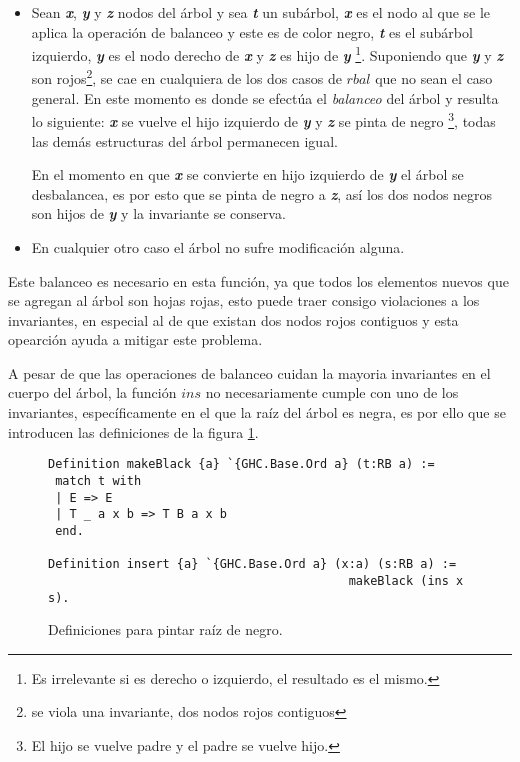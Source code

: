 \begin{itemize}
    \item Sean \textbf{\textit{x}}, \textbf{\textit{y}} y \textbf{\textit{z}} nodos del \'arbol y sea \textbf{\textit{t}} un subárbol, \textbf{\textit{x}} es el nodo al que se le
    aplica la operaci\'on de balanceo y este es de color negro, \textbf{\textit{t}} es el subárbol izquierdo, \textbf{\textit{y}}
    es el nodo derecho de \textbf{\textit{x}} y \textbf{\textit{z}} es hijo de \textbf{\textit{y}} \footnote{Es irrelevante si es derecho o
    izquierdo, el resultado es el mismo.}. Suponiendo que \textbf{\textit{y}} y \textbf{\textit{z}} son rojos\footnote{se viola una
    invariante, dos nodos rojos contiguos}, se cae en cualquiera de los dos casos de $rbal$ que no
    sean el caso general. En este momento es donde se efectúa el \textit{balanceo} del árbol y
    resulta lo siguiente: \textbf{\textit{x}} se vuelve el hijo izquierdo de \textbf{\textit{y}} y \textbf{\textit{z}} se pinta de negro
    \footnote{El hijo se vuelve padre y el padre se vuelve hijo.}, todas las dem\'as estructuras del
    \'arbol permanecen igual.

    En el momento en que \textbf{\textit{x}} se convierte en hijo izquierdo de \textbf{\textit{y}} el \'arbol se desbalancea, es
    por esto que se pinta de negro a \textbf{\textit{z}}, así los dos nodos negros son hijos de \textbf{\textit{y}} y la invariante
    se conserva.
    \item En cualquier otro caso el \'arbol no sufre modificaci\'on alguna.
\end{itemize}

Este balanceo es necesario en esta funci\'on, ya que todos los elementos nuevos que se agregan al \'arbol 
son hojas rojas, esto puede traer consigo violaciones a los invariantes, en especial al de que existan dos nodos rojos 
contiguos y esta opearci\'on ayuda a mitigar este problema.

A pesar de que las operaciones de balanceo cuidan la mayoria invariantes en el cuerpo del \'arbol,
la función $ins$ no necesariamente cumple con uno de los invariantes, espec\'ificamente
en el que la raíz del árbol es negra, es por ello que se introducen las definiciones de 
la figura \ref{raiz_negra_func}.

\begin{figure}
\centering
\captionsetup{justification=centering}
\begin{verbatim}
Definition makeBlack {a} `{GHC.Base.Ord a} (t:RB a) :=
 match t with
 | E => E
 | T _ a x b => T B a x b
 end.

Definition insert {a} `{GHC.Base.Ord a} (x:a) (s:RB a) :=
                                          makeBlack (ins x s).
\end{verbatim}
\caption{Definiciones para pintar ra\'iz de negro.}
\label{raiz_negra_func}
\end{figure}

